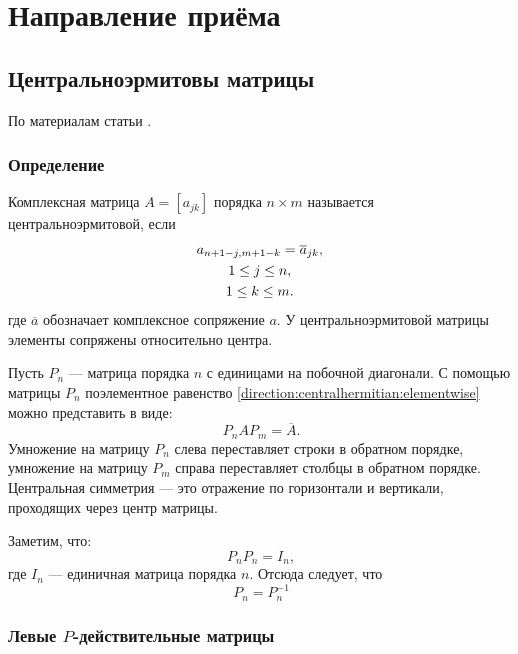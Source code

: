 \chapter{Направление приёма}

\section{Центральноэрмитовы матрицы}

По материалам статьи \cite{Lee}.

\subsection{Определение}

Комплексная матрица $A=[a_{jk}]$ порядка $n \times m$ называется центральноэрмитовой, если
\begin{gather}
    a_{n+1-j, m+1-k} = \overline{a}_{jk},
    \label{direction:centralhermitian:elementwise} \\
    1 \le j \le n,
    \notag \\
    1 \le k \le m.
    \notag
\end{gather}
где $\overline{a}$ обозначает комплексное сопряжение $a$. У центральноэрмитовой матрицы элементы сопряжены относительно центра.

Пусть $P_n$ --- матрица порядка $n$ с единицами на побочной диагонали. С помощью матрицы $P_n$ поэлементное равенство
\eqref{direction:centralhermitian:elementwise} можно представить в виде:
\begin{equation}~\label{direction:centralhermitian:matrix}
    P_n A P_m = \overline{A} .
\end{equation}
Умножение на матрицу $P_n$ слева переставляет строки в обратном порядке, умножение на матрицу $P_m$ справа переставляет столбцы в
обратном порядке. Центральная симметрия --- это отражение по горизонтали и вертикали, проходящих через центр матрицы.

Заметим, что:
\begin{equation}~\label{direction:V:idempotence}
    P_n P_n = I_n ,
\end{equation}
где $I_n$ --- единичная матрица порядка $n$. Отсюда следует, что
\begin{equation}~\label{direction:V:inversion}
    P_n = P_n^{-1}
\end{equation}

\subsection{Левые $P$-действительные матрицы}

